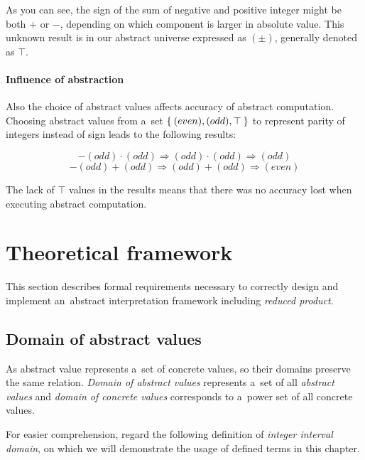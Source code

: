 \documentclass[12pt,oneside]{fithesis2}
\theoremstyle{definition}
\begin{document}
As you can see, the sign of the sum of negative and positive integer might be both $+$ or $-$, depending on which component is larger in absolute value. This unknown result is in our abstract universe expressed as $(\pm)$, generally denoted as $\top$.

\paragraph{Influence of abstraction}
Also the choice of abstract values affects accuracy of abstract computation. Choosing abstract values from a~set $\Set{(even), (odd), \top}$ to represent parity of integers instead of sign leads to the following results:

\[ -(odd) \cdot (odd) \Rightarrow (odd) \cdot (odd) \Rightarrow (odd) \]
\[ -(odd) + (odd) \Rightarrow (odd) + (odd) \Rightarrow (even) \]

The lack of $\top$ values in the results means that there was no accuracy lost when executing abstract computation.

\section{Theoretical framework}

This section describes formal requirements necessary to correctly design and implement an~abstract interpretation framework including \textit{reduced product}.

\subsection{Domain of abstract values}

As abstract value represents a~set of concrete values, so their domains preserve the same relation. \textit{Domain of abstract values} represents a~set of all \textit{abstract values} and \textit{domain of concrete values} corresponds to a~power set of all concrete values.

For easier comprehension, regard the following definition of \textit{integer interval domain}\cite{mine-WING12}, on which we will demonstrate the usage of defined terms in this chapter.
\end{document}
